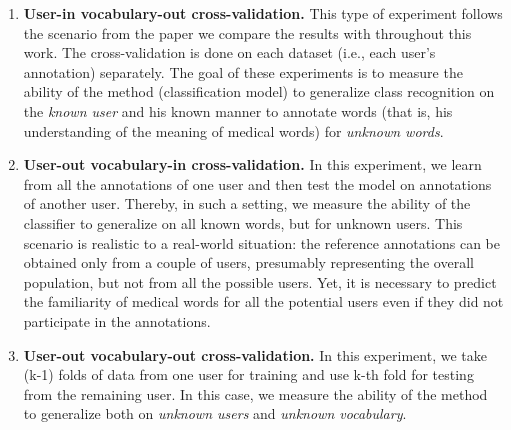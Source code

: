 \begin{enumerate}
    \item \textbf{User-in vocabulary-out cross-validation.} This type of experiment follows the scenario from the paper \citep{Grabar-PITR2014} we compare the results with throughout this work.  The cross-validation is done on each dataset (i.e., each user's annotation) separately. The goal of these experiments is to measure the ability of the method (classification model) to generalize class recognition on the \textit{known user} and his known manner to annotate words (that is, his understanding of the meaning of medical words) for \textit{unknown words}. 

      
    \item \textbf{User-out vocabulary-in cross-validation.} In this experiment, we learn from all the annotations of one user and then test the model on annotations of another user. Thereby, in such a setting, we measure the ability of the classifier to generalize on all known words, but for unknown users. This scenario is realistic to a real-world situation: the reference annotations can be obtained only from a couple of users, presumably representing the overall population, but not from all the possible users. Yet, it is necessary to predict the familiarity of medical words for all the potential users even if they did not participate in the annotations.

      
    \item \textbf{User-out vocabulary-out cross-validation.} In this experiment, we take (k-1) folds of data from one user for training and use k-th fold for testing from the remaining user. In this case, we measure the ability of the method to generalize both on \textit{unknown users} and \textit{ unknown vocabulary}.

\end{enumerate}

